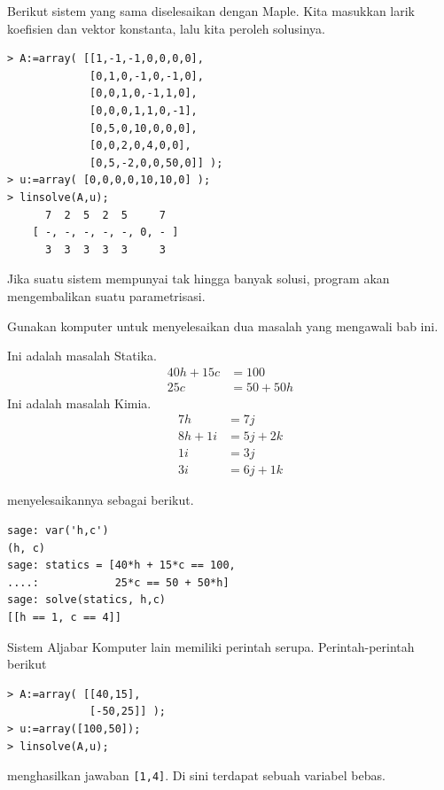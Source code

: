 Berikut sistem yang sama diselesaikan dengan Maple.
Kita masukkan larik koefisien 
dan vektor konstanta,
lalu kita peroleh solusinya.
\begin{lstlisting}
> A:=array( [[1,-1,-1,0,0,0,0],
             [0,1,0,-1,0,-1,0],
             [0,0,1,0,-1,1,0],
             [0,0,0,1,1,0,-1],
             [0,5,0,10,0,0,0],
             [0,0,2,0,4,0,0],
             [0,5,-2,0,0,50,0]] );
> u:=array( [0,0,0,0,10,10,0] );
> linsolve(A,u);
      7  2  5  2  5     7
    [ -, -, -, -, -, 0, - ]
      3  3  3  3  3     3
\end{lstlisting}

Jika suatu sistem mempunyai tak hingga banyak solusi, 
program akan mengembalikan suatu parametrisasi.


\begin{exercises}
  \item 
    Gunakan komputer untuk menyelesaikan dua masalah yang mengawali
    bab ini.
    \begin{exparts}
      \partsitem Ini adalah masalah Statika.
         \begin{align*}
            40h+15c  &= 100  \\
            25c      &= 50+50h
         \end{align*}
      \partsitem Ini adalah masalah Kimia.
         \begin{align*} 
             7h      &= 7j  \\
             8h +1i  &= 5j+2k  \\
             1i      &= 3j  \\
             3i      &= 6j+1k
         \end{align*}
    \end{exparts}
    \begin{answer}
      \begin{exparts}
        \partsitem 
\Sage{} menyelesaikannya sebagai berikut.
\begin{lstlisting}
sage: var('h,c')
(h, c)
sage: statics = [40*h + 15*c == 100,
....:            25*c == 50 + 50*h]
sage: solve(statics, h,c)
[[h == 1, c == 4]] 
\end{lstlisting}
Sistem Aljabar Komputer lain memiliki perintah serupa.
Perintah-perintah \Maple{} berikut
\begin{lstlisting}
> A:=array( [[40,15],
             [-50,25]] );
> u:=array([100,50]);
> linsolve(A,u);
\end{lstlisting}
           menghasilkan jawaban \lstinline![1,4]!.
        \partsitem Di sini terdapat sebuah variabel bebas.

\end{exparts}
\end{answer}
\end{exercises}
